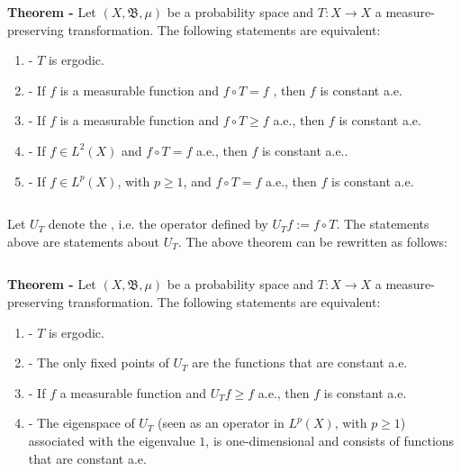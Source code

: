 \documentclass[12pt]{article}
\begin{document}
{\bf Theorem -} Let $(X, \mathfrak{B}, \mu)$ be a probability space and $T:X \longrightarrow X$ a measure-preserving transformation. The following statements are equivalent:

\begin{enumerate}
\item - $T$ is ergodic.
\item - If $f$ is a measurable function and $f\circ T =f$ , then $f$ is constant a.e.
\item - If $f$ is a measurable function and $f\circ T \geq f$ a.e., then $f$ is constant a.e.
\item - If $f \in L^2(X)$ and $f\circ T =f$ a.e., then $f$ is constant a.e..
\item - If $f \in L^p(X)$, with $p \geq 1$, and $f\circ T =f$ a.e., then $f$ is constant a.e.
\end{enumerate}

$\,$

Let $U_T$ denote the , i.e. the operator defined by $U_T f:= f \circ T$. The statements above are statements about $U_T$. The above theorem can be rewritten as follows:

$\,$

{\bf Theorem -} Let $(X, \mathfrak{B}, \mu)$ be a probability space and $T:X \longrightarrow X$ a measure-preserving transformation. The following statements are equivalent:

\begin{enumerate}
\item - $T$ is ergodic.
\item - The only fixed points of $U_T$ are the functions that are constant a.e.
\item - If $f$ a measurable function and $U_T f \geq f$ a.e., then $f$ is constant a.e.
\item - The eigenspace of $U_T$ (seen as an operator in $L^p(X)$, with $p \geq 1$) associated with the eigenvalue $1$, is one-dimensional and consists of functions that are constant a.e.
\end{enumerate}
\end{document}
